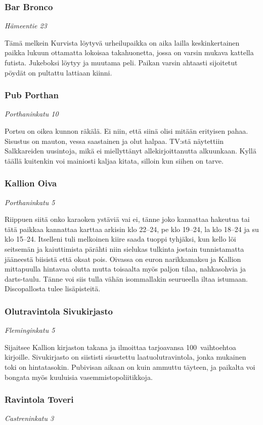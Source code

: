 \documentclass[../ala_hataile.tex]{subfiles}
\begin{document}
\subsubsection*{Bar Bronco}
\textit{Hämeentie 23}

Tämä melkein Kurvista löytyvä urheilupaikka
on aika lailla keskinkertainen paikka lukuun
ottamatta lokoisaa takahuonetta, jossa
on varsin mukava kattella futista. Jukeboksi löytyy ja muutama
peli. Paikan varsin ahtaasti sijoitetut
pöydät on pultattu lattiaan kiinni.
\subsubsection*{Pub Porthan}
\textit{Porthaninkatu 10}

Portsu on oikea kunnon räkälä. Ei niin,
että siinä olisi mitään erityisen pahaa. Sisustus
on mauton, vessa saastainen ja olut
halpaa. TV:stä näytettiin Salkkareiden
uusintoja, mikä ei miellyttänyt allekirjoittanutta
alkuunkaan. Kyllä täällä kuitenkin
voi mainiosti kaljaa kitata, silloin kun siihen
on tarve.
\subsubsection*{Kallion Oiva}
\textit{Porthaninkatu 5}

Riippuen siitä onko karaoken ystäviä vai
ei, tänne joko kannattaa hakeutua tai tätä
paikkaa kannattaa karttaa arkisin klo 22--24, pe klo 19--24,
la klo 18--24 ja su klo 15--24. Itselleni tuli
melkoinen kiire saada tuoppi tyhjäksi, kun
kello löi seitsemän ja kaiuttimista pärähti
niin sielukas tulkinta jostain tunnistamatta
jääneestä biisistä että oksat pois. Oivassa
on euron narikkamaksu ja Kallion mittapuulla
hintavaa olutta mutta toisaalta myös
paljon tilaa, nahkasohvia ja darts-taulu.
Tänne voi siis tulla vähän isommallakin
seurueella iltaa istumaan. Discopallosta tulee
lisäpisteitä.
\subsubsection*{Olutravintola Sivukirjasto}
\textit{Fleminginkatu 5}

Sijaitsee Kallion kirjaston takana ja ilmoittaa
tarjoavansa 100~vaihtoehtoa kirjoille.
Sivukirjasto on siististi sisustettu
laatuolutravintola, jonka mukainen toki on
hintatasokin. Pubivisan aikaan on kuin ammuttu
täyteen, ja paikalta voi bongata myös kuuluisia vasemmistopoliitikkoja.
\subsubsection*{Ravintola Toveri}
\textit{Castreninkatu 3}
\end{document}
